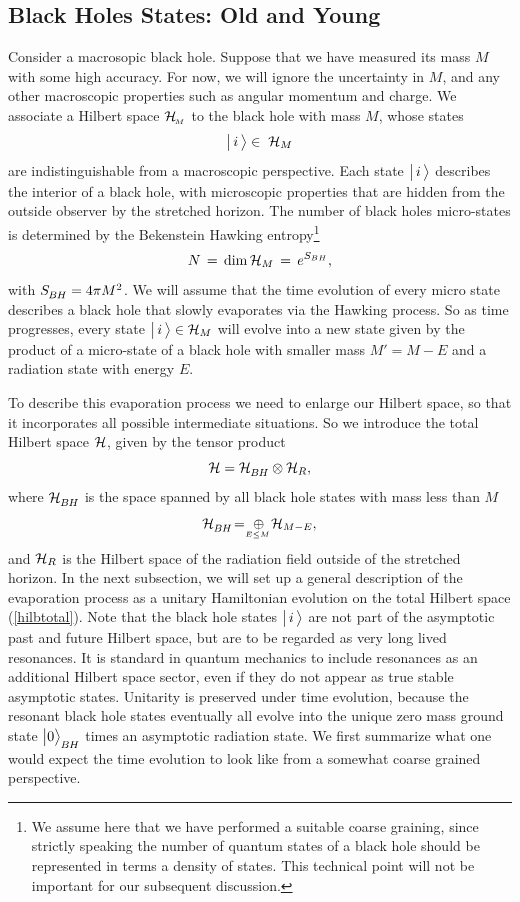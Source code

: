 \documentclass[12pt]{article}%
\def\be{\begin{equation}}
\def\ee{\end{equation}}
\begin{document}
\subsection{Black Holes States: Old and Young}

Consider a macrosopic black hole.
Suppose that we have measured its mass $M$ with some high accuracy.  For now, we will ignore the uncertainty in $M$, and any
other macroscopic properties such as angular momentum and charge.
We associate a Hilbert space ${\cal H}_{{}_{\! M}}$ to the black hole with mass $M$, whose states
\be
\bigll|\,\iii\,\bigrr\rangle\in\; {\cal H}_M
\ee
are indistinguishable from a macroscopic perspective. Each state $\bigl| \, i \, \bigr\rangle$ describes the interior of a black hole, with microscopic properties that are hidden from the outside observer by the stretched horizon. The number of black holes micro-states is determined by the Bekenstein Hawking entropy\footnote{We assume here that we have performed a suitable coarse graining, since strictly speaking the number of quantum states of a black hole should be represented in terms a density of states. This technical point will not be important for our subsequent discussion.} 
\be
N \, = \, {\rm dim}\, {\cal H}_M \, =\,  e^{S_{BH}},
\ee
with $S_\BH = 4\pi M^2$. 
We will assume that the time evolution of every micro state describes a black hole that slowly evaporates via the Hawking process. So as time progresses, every state $\bigll|\, i\,\bigrr\rangle \in {\cal H}_M$ will evolve into a new state  given by the product of a micro-state of a black hole with smaller mass $M' = M-E$ and a radiation state with energy $E$.  

To describe this evaporation process we need to enlarge our Hilbert space, so that it incorporates all possible intermediate situations. So we introduce the total Hilbert space $\cal H$, given by the tensor product
\be
\label{hilbtotal}
{\cal H} = {\cal H}_\BH \otimes {\cal H}_R,
\ee
where ${\cal H}_\BH$ is the space spanned by all black hole states with mass less than $M$
\be
\label{bhilb}
 {\cal H}_\BH \! =\ \oplus_{\strut \!\!\!\!\!\!\!\!\!\!{}_{E\leq M}}{\cal H}_{M-E},
\ee 
and  ${\cal H}_R$ is the Hilbert space of the radiation field outside of the stretched horizon. 
 In the next subsection, we will set up a general description of the
evaporation process as a unitary Hamiltonian evolution on the total Hilbert space (\ref{hilbtotal}). 
Note that the black hole states $\bigl|\, i\,\bigr\rangle$ 
are not part of the asymptotic past and future Hilbert space, but are to be regarded as very long lived resonances.  It is standard in quantum mechanics to include resonances as an additional
 Hilbert space sector, even if they do not appear as true stable asymptotic states. 
 Unitarity is preserved under time evolution, because the resonant black hole states eventually all evolve
into the unique zero mass ground state $\bigl| 0 \ra_\BH$ times an asymptotic radiation state.
 We first summarize what one would expect the time evolution to look 
like from a somewhat coarse grained perspective.
\end{document}
